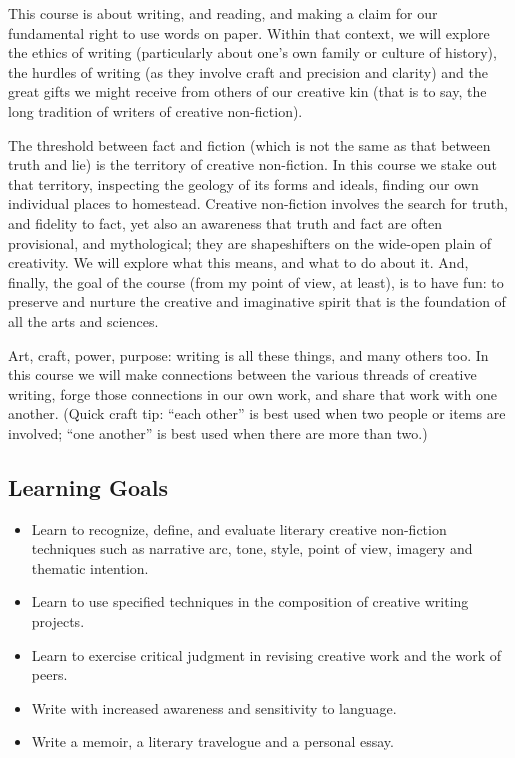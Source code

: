 \documentclass[letterpaper,10pt,headsepline]{scrreprt}
\begin{document}
This course is about writing, and reading, and making a claim for our
fundamental right to use words on paper. Within that context, we will
explore the ethics of writing (particularly about one's own family or
culture of history), the hurdles of writing (as they involve craft and
precision and clarity) and the great gifts we might receive from
others of our creative kin (that is to say, the long tradition of
writers of creative non-fiction).

The threshold between fact and fiction (which is not the same as that
between truth and lie) is the territory of creative non-fiction. In
this course we stake out that territory, inspecting the geology of its
forms and ideals, finding our own individual places to homestead.
Creative non-fiction involves the search for truth, and fidelity to
fact, yet also an awareness that truth and fact are often provisional,
and mythological; they are shapeshifters on the wide-open plain of
creativity. We will explore what this means, and what to do about it.
And, finally, the goal of the course (from my point of view, at
least), is to have fun: to preserve and nurture the creative and
imaginative spirit that is the foundation of all the arts and
sciences.

Art, craft, power, purpose: writing is all these things, and many
others too. In this course we will make connections between the
various threads of creative writing, forge those connections in our
own work, and share that work with one another. (Quick craft tip:
``each other'' is best used when two people or items are involved; ``one
another'' is best used when there are more than two.)

\subsection{Learning Goals}
\begin{itemize}
\item Learn to recognize, define, and evaluate literary creative
  non-fiction techniques such as narrative arc, tone, style, point of
  view, imagery and thematic intention.
\item Learn to use specified techniques in the composition of creative
  writing projects.
\item Learn to exercise critical judgment in revising creative work
  and the work of peers.
\item Write with increased awareness and sensitivity to language.
\item Write a memoir, a literary travelogue and a personal essay.
\end{itemize}
\clearpage
\end{document}
